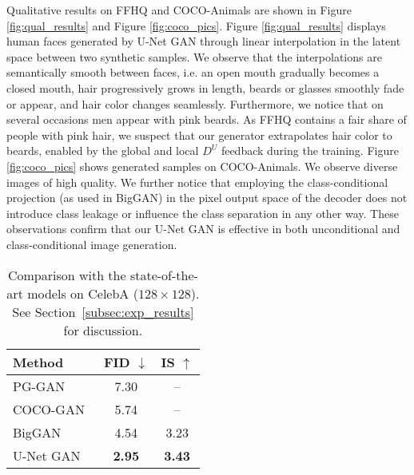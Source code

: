 \documentclass[10pt,twocolumn,letterpaper]{article}
\begin{document}
Qualitative results on FFHQ and COCO-Animals are shown in Figure \ref{fig:qual_results} and Figure \ref{fig:coco_pics}. Figure \ref{fig:qual_results} displays human faces generated by U-Net GAN through linear interpolation in the latent space between two synthetic samples. We observe that the interpolations are semantically smooth between faces, i.e. an open mouth gradually becomes a closed mouth, hair progressively grows in length, beards or glasses smoothly fade or appear, and hair color changes seamlessly. Furthermore, we notice that on several occasions men appear with pink beards. As FFHQ contains a fair share of people with pink hair, we suspect that our generator extrapolates hair color to beards, enabled by the global and local $D^U$ feedback during the training.
Figure \ref{fig:coco_pics} shows generated samples on COCO-Animals. We observe diverse images of high quality. We further notice that employing the class-conditional projection (as used in BigGAN) in the pixel output space of the decoder does not introduce class leakage or influence the class separation in any other way. These observations confirm that our U-Net GAN is effective in both unconditional and class-conditional image generation.


\begin{table}[t]
\vspace{-1em}
\setlength{\tabcolsep}{0.5em}
\renewcommand{\arraystretch}{1.1}
	\centering

	\begin{tabular}{l@{\hskip 1.3in}cc}
	Method & \normalsize{} FID $\downarrow$ & \normalsize{} IS $\uparrow$\tabularnewline
	\hline 	\hline

	\normalsize{} PG-GAN \cite{karras2018progressive} &  \normalsize{} 7.30 & \normalsize{} -- \tabularnewline
	\normalsize{} COCO-GAN~\cite{Lin2019COCOGANGB} &  \normalsize{} 5.74 & \normalsize{} -- \tabularnewline

	\normalsize{}  BigGAN~\cite{Brock2019} &  \normalsize{} 4.54 & \normalsize{} 3.23 \tabularnewline
	\normalsize{} U-Net GAN & \normalsize{} \textbf{2.95} & \normalsize{} \textbf{3.43} \tabularnewline
\end{tabular}


	\vspace{-0.5em}
    \caption{Comparison with the state-of-the-art models on CelebA ($128\times 128$). See Section~\ref{subsec:exp_results} for discussion.} \label{table:celeba_fid} \vspace{-1em}
\end{table}
 
\end{document}
